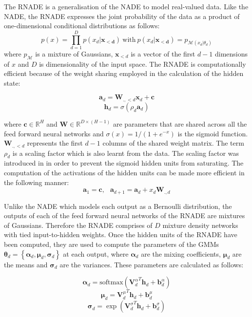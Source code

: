 \documentclass{article} %
\begin{document}
The RNADE is a generalisation of the NADE to model real-valued data. Like the NADE, the RNADE expresses the joint probability of the data as a product of one-dimensional conditional distributions as follows:
$$ p(x) = \prod_{d=1}^{D} p(x_d|\mathbf{x_{<d}}) \: \text{with} \: p(x_d|\mathbf{x_{<d}}) = p_{\mathcal{M}(x_d|\theta_d)} $$ where $p_{\mathcal{M}}$ is a mixture of Gaussians, $\boldsymbol{x}_{<d}$ is a vector of the first $d-1$ dimensions of $x$ and $D$ is dimensionality of the input space. The RNADE is computationally efficient because of the weight sharing employed in the calculation of the hidden state: 

$$ \mathbf{a}_d = \boldsymbol{W}_{.,<d}\boldsymbol{x}_d + \mathbf{c}$$
$$ \boldsymbol{h}_d = \sigma (\rho_d \mathbf{a}_d)$$


where $\mathbf{c} \in \mathbb{R}^{H}$ and $\boldsymbol{W} \in \mathbb{R}^{D \times (H-1)}$ are parameters that are shared across all the feed forward neural networks and $\sigma(x) = 1/(1+e^{-x})$ is the sigmoid function. $\boldsymbol{W}_{.,<d}$ represents the first $d-1$ columns of the shared weight matrix. The term $\rho_d$ is a scaling factor which is also learnt from the data. The scaling factor was introduced in \cite{AISTATS2011_Bengio11} in order to prevent the sigmoid hidden units from saturating. The computation of the activations of the hidden units can be made more efficient in the following manner:
$$ \mathbf{a}_1 = \mathbf{c}, \: \: \; \mathbf{a}_{d+1} = \mathbf{a}_{d} + x_d \mathbf{W}_{.,d}$$

 Unlike the NADE which models each output as a Bernoulli distribution, the outputs of each of the feed forward neural networks of the RNADE are mixtures of Gaussians. Therefore the RNADE comprises of $D$ mixture density networks with tied input-to-hidden weights. Once the hidden units of the RNADE have been computed, they are used to compute the parameters of the GMMs $\boldsymbol{\theta}_d  = \left\{ \boldsymbol{\alpha}_d, \boldsymbol{\mu}_d, \boldsymbol{\sigma}_d \right\}$ at each output, where $\boldsymbol{\alpha}_d$ are the mixing coefficients, $\boldsymbol{\mu}_d$ are the means and $\boldsymbol{\sigma}_d$ are the variances. These parameters are calculated as follows:

$$ \boldsymbol{\alpha}_d = \text{softmax} ({\mathbf{V}_{d}^{\alpha}}^T \mathbf{h}_d + \mathbf{b}^{\alpha}_{d})$$
$$ \boldsymbol{\mu}_d = {\mathbf{V}_{d}^{\mu}}^T \mathbf{h}_d + \mathbf{b}^{\mu}_{d}$$
$$ \boldsymbol{\sigma}_d = \exp ({\mathbf{V}_{d}^{\sigma}}^T \mathbf{h}_d + \mathbf{b}^{\sigma}_{d})$$
\end{document}

